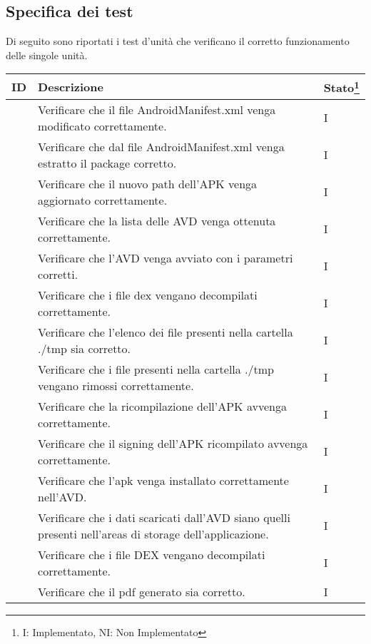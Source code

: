 \subsection{Specifica dei test}\label{subsec:specifica-dei-test-unitari}
Di seguito sono riportati i test d'unità che verificano il corretto funzionamento delle singole unità.
\begin{longtable}{ |C{1.5cm} | C{8.5cm}| C{1.5cm} |}
    \hline
    \textbf{ID} &
    \textbf{Descrizione} &
    \textbf{Stato\footnote{I: Implementato, NI: Non Implementato}} \\\hline
     & Verificare che il file AndroidManifest.xml venga modificato correttamente.
    & I \\\hline
     & Verificare che dal file AndroidManifest.xml venga estratto il package corretto.
    & I \\\hline
     & Verificare che il nuovo path dell'APK venga aggiornato correttamente.
    & I \\\hline
     & Verificare che la lista delle AVD venga ottenuta correttamente.
    & I \\\hline
     & Verificare che l'AVD venga avviato con i parametri corretti.
    & I \\\hline
     & Verificare che i file dex vengano decompilati correttamente.
    & I \\\hline
     & Verificare che l'elenco dei file presenti nella cartella ./tmp sia corretto.
    & I \\\hline
     & Verificare che i file presenti nella cartella ./tmp vengano rimossi correttamente.
    & I \\\hline
     & Verificare che la ricompilazione dell'APK avvenga correttamente.
    & I \\\hline
     & Verificare che il signing dell'APK ricompilato avvenga correttamente.
    & I \\\hline
     & Verificare che l'apk venga installato correttamente nell'AVD.
    & I \\\hline
     & Verificare che i dati scaricati dall'AVD siano quelli presenti nell'areas di storage dell'applicazione.
    & I \\\hline
     & Verificare che i file DEX vengano decompilati correttamente.
    & I \\\hline
     & Verificare che il pdf generato sia corretto.
    & I \\\hline

\end{longtable}
